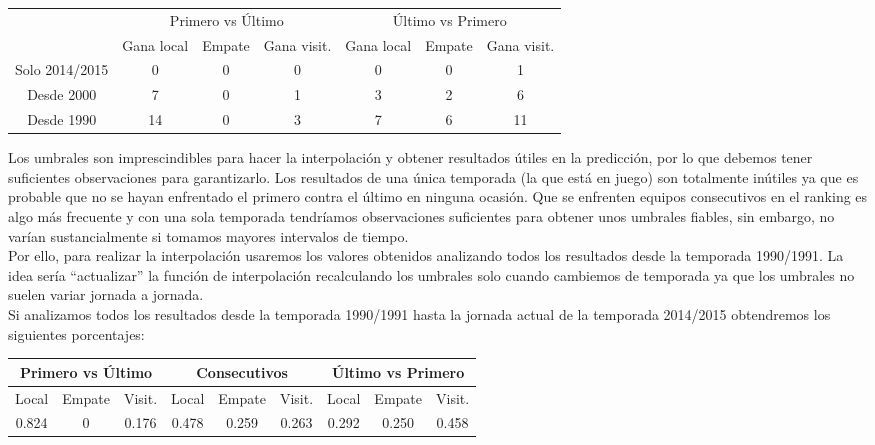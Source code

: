 \begin{table}[H]
	\centering
	\begin{tabular}{|c|c|c|c|c|c|c|}
		\hline
		& \multicolumn{3}{|c|}{Primero vs Último} & \multicolumn{3}{|c|}{Último vs Primero} \\ \cline{2-7}
		& Gana local & Empate & Gana visit. & Gana local & Empate & Gana visit. \\ \hline 
		Solo 2014/2015 & 0 & 0 & 0 & 0 & 0 & 1 \\ \hline
		Desde 2000 & 7 & 0 & 1 & 3 & 2 & 6 \\ \hline
		Desde 1990 & 14 & 0 & 3 & 7 & 6 & 11 \\ \hline
	\end{tabular}
\end{table}

Los umbrales son imprescindibles para hacer la interpolación y obtener resultados útiles en la predicción, por lo que debemos tener suficientes observaciones para garantizarlo. Los resultados de una única temporada (la que está en juego) son totalmente inútiles ya que es probable que no se hayan enfrentado el primero contra el último en ninguna ocasión. Que se enfrenten equipos consecutivos en el ranking es algo más frecuente y con una sola temporada tendríamos observaciones suficientes para obtener unos umbrales fiables, sin embargo, no varían sustancialmente si tomamos mayores intervalos de tiempo.\\ 

Por ello, para realizar la interpolación usaremos los valores obtenidos analizando todos los resultados desde la temporada 1990/1991. La idea sería ``actualizar'' la función de interpolación recalculando los umbrales solo cuando cambiemos de temporada ya que los umbrales no suelen variar jornada a jornada.\\

Si analizamos todos los resultados desde la temporada 1990/1991 hasta la jornada actual de la temporada 2014/2015 obtendremos los siguientes porcentajes:

\begin{table}[H]
	\centering
	\begin{tabular}{|c|c|c|c|c|c|c|c|c|}
		\hline
		\multicolumn{3}{|c|}{Primero vs Último} & \multicolumn{3}{|c|}{Consecutivos} & \multicolumn{3}{|c|}{Último vs Primero} \\ \hline
		Local & Empate & Visit. & Local & Empate & Visit. & Local & Empate & Visit.\\ \hline 
		0.824 & 0 & 0.176 & 0.478 & 0.259 & 0.263 & 0.292 & 0.250 & 0.458 \\ \hline
	\end{tabular}
\end{table}

